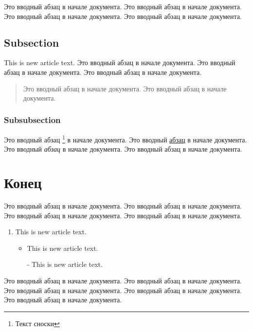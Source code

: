 \documentclass[a4paper,12pt]{article}
\begin{document}
    Это вводный абзац в начале документа.
    Это вводный абзац в начале документа.
    Это вводный абзац в начале документа.
    Это вводный абзац в начале документа.

    \subsection{Subsection}

    This is new article text.
    Это вводный абзац в начале документа.
    Это вводный абзац в начале документа.
    Это вводный абзац в начале документа.

    \begin{quote}
        Это вводный абзац в начале документа.
        Это вводный абзац в начале документа.
    \end{quote}

    \subsubsection{Subsubsection}

    Это вводный абзац
    \footnote{ %
        Текст сноски
    }
    в начале документа.
    Это вводный \underline{абзац} в начале документа.
    Это вводный \emph{абзац} в начале документа.
    Это вводный \textsf{абзац} в начале документа.

    \section{Конец}

    Это вводный абзац в начале документа.
    Это вводный абзац в начале документа.
    Это вводный абзац в начале документа.
    Это вводный абзац в начале документа.

    \begin{enumerate}
        \item This is new article text.
        \begin{itemize}
            \item This is new article text.
            \item[-] This is new article text.
        \end{itemize}
    \end{enumerate}

    Это вводный абзац в начале документа.
    Это вводный абзац в начале документа.
    Это вводный абзац в начале документа.
    Это вводный абзац в начале документа.
    Это вводный абзац в начале документа.

    \newpage
    \tableofcontents
\end{document}
